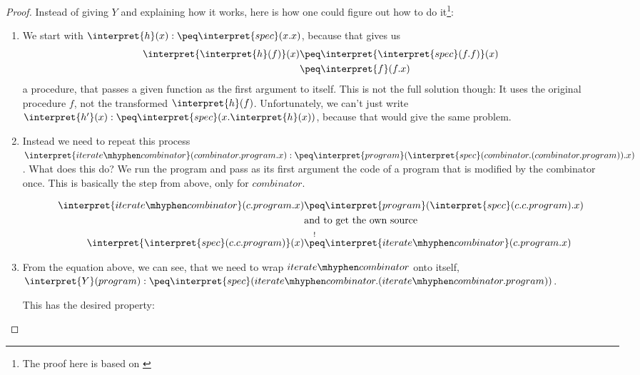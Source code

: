 \begin{proof}
	Instead of giving $Y$ and explaining how it works, here is how one could 
	figure out how to do it\footnote{The proof here is based on \cite{dalenrecursion}}:

	\begin{enumerate}
		\item We start with $\interpret{h}(x):\peq \interpret{spec}(x.x)$, 
			because that gives us 
			\begin{equation*}
				\begin{split}
					\interpret{\interpret{h}(f)}(x)
					&\peq \interpret{\interpret{spec}(f.f)}(x)\\
					&\peq \interpret{f}(f.x)
				\end{split}
			\end{equation*}
			a procedure, that passes a given function as the first argument to 
			itself. This is not the full solution though: It uses the original 
			procedure $f$, not the transformed $\interpret{h}(f)$. Unfortunately, 
			we can't just write 
			$\interpret{h'}(x):\peq \interpret{spec}(x.\interpret{h}(x))$, because 
			that would give the same problem. 
		\item Instead we need to repeat this process 
			$\interpret{iterate\mhyphen combinator}(combinator.program.x):\peq 
			\interpret{program}(\interpret{spec}(combinator.(combinator.program)).x)$. 
			What does this do? We run the program and pass as its first argument 
			the code of a program that is modified by the combinator once. This is 
			basically the step from above, only for $combinator$.

			\begin{equation*}
				\begin{split}
					\interpret{iterate\mhyphen combinator}(c.program.x)
					&\peq \interpret{program}(\interpret{spec}(c.c.program).x) \\
					&\text{and to get the own source}\\
					\interpret{\interpret{spec}(c.c.program)}(x)
					&\overset{!}{\peq} \interpret{iterate\mhyphen combinator}(c.program.x)
				\end{split}
			\end{equation*}
		\item From the equation above, we can see, that we need to wrap
			$iterate\mhyphen combinator$ onto itself, 
			$\interpret{Y}(program):\peq \interpret{spec}(iterate\mhyphen
			combinator.(iterate\mhyphen combinator.program))$. 

			This has the desired property:


\end{enumerate}
\end{proof}
